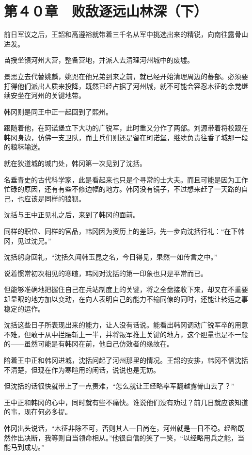 \section{第４０章　败敌逐远山林深（下）}

前日军议之后，王韶和高遵裕就带着三千名从军中挑选出来的精锐，向南往露骨山进发。

苗授坐镇河州大营，整备营地，并派人去清理河州城中的废墟。

景思立去代替姚麟，姚兕在他兄弟到来之前，就已经开始清理周边的蕃部。必须要打得他们派出人质来投降，既然已经占据了河州城，就不可能会容忍木征的余党继续安坐在河州的关键地带。

韩冈则是同王中正一起回到了熙州。

跟随着他，在珂诺堡立下大功的广锐军，此时重又分作了两部。刘源带着将校跟在韩冈身边，仿佛一支卫队，而士兵们则还是留在珂诺堡，继续负责往香子城那一段的粮秣输送。

就在狄道城的城门处，韩冈第一次见到了沈括。

名垂青史的古代科学家，此是看起来也只是个寻常的士大夫。而且可能是因为工作忙碌的原因，还有有些不修边幅的地方。韩冈没有镜子，不过想来赶了一天路的自己，也应该是同样的狼狈。

沈括与王中正见礼之后，来到了韩冈的面前。

同样的职位、同样的官品，韩冈因为资历上的差距，先一步向沈括行礼：“在下韩冈，见过沈兄。”

沈括躬身回礼，“沈括久闻韩玉昆之名，今日得见，果然一如传言之中。”

说着惯常初次相见的寒暄，韩冈对沈括的第一印象也只是平常而已。

但能够准确地把握住自己在兵站制度上的关键，将之全盘接收下来，却又在不重要却显眼的地方加以变动，在向人表明自己的能力不输同僚的同时，还能让转运之事稳定的运作。

沈括这些日子所表现出来的能力，让人没有话说。能看出韩冈调动广锐军卒的用意不难，但敢于从中拦腰斩上一半，并将叛军推上关键的地方，这个胆量也是不一般的——虽然可能是有韩冈在前，他自己仿效者的缘故在。

陪着王中正和韩冈进城，沈括问起了河州那里的情况。王韶的安排，韩冈不信沈括不清楚，但现在作为寒暄用的闲话，说说也是无妨。

但沈括的话很快就带上了一点责难，“怎么就让王经略率军翻越露骨山去了？”

王中正和韩冈的心中，同时就有些不痛快。谁说他们没有劝过？前几日就应该知道的事，现在何必多提。

韩冈出头说话，“木征非除不可，否则其人一日尚在，河州就是一日不稳。经略既然作出决断，我等则自当领命相从。”他很自信的笑了一笑，“以经略用兵之能，当能马到成功。”

